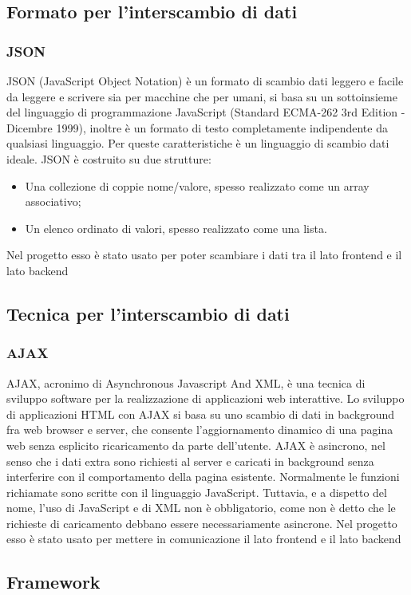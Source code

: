 \subsection{Formato per l’interscambio di dati}
\subsubsection{JSON}
JSON (JavaScript Object Notation) è un formato di scambio dati leggero e facile
da leggere e scrivere sia per macchine che per umani, si basa su un sottoinsieme del
linguaggio di programmazione JavaScript (Standard ECMA-262 3rd Edition - Dicembre
1999), inoltre è un formato di testo completamente indipendente da qualsiasi linguaggio.
Per queste caratteristiche è un linguaggio di scambio dati ideale. JSON è costruito su
due strutture:
\begin{itemize}
\item Una collezione di coppie nome/valore, spesso realizzato come un array associativo;
\item Un elenco ordinato di valori, spesso realizzato come una lista.
\end{itemize}
Nel progetto esso è stato usato per poter scambiare i dati tra il lato frontend e il lato backend
\subsection{Tecnica per l’interscambio di dati}
\subsubsection{AJAX}
AJAX, acronimo di Asynchronous Javascript And XML, è una tecnica di sviluppo
software per la realizzazione di applicazioni web interattive.
Lo sviluppo di applicazioni HTML con AJAX si basa su uno scambio di dati in
background fra web browser e server, che consente l’aggiornamento dinamico di una
pagina web senza esplicito ricaricamento da parte dell’utente.
AJAX è asincrono, nel senso che i dati extra sono richiesti al server e caricati in
background senza interferire con il comportamento della pagina esistente. Normalmente
le funzioni richiamate sono scritte con il linguaggio JavaScript. Tuttavia, e a dispetto
del nome, l’uso di JavaScript e di XML non è obbligatorio, come non è detto che le
richieste di caricamento debbano essere necessariamente asincrone.
Nel progetto esso è stato usato per mettere in comunicazione il lato frontend e il lato backend
\subsection{Framework}
